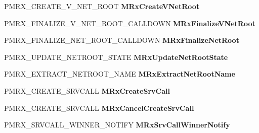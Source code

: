 \begin{DoxyCompactItemize}
P\+M\+R\+X\+\_\+\+C\+R\+E\+A\+T\+E\+\_\+\+V\+\_\+\+N\+E\+T\+\_\+\+R\+O\+OT {\bfseries M\+Rx\+Create\+V\+Net\+Root}
\item 
\mbox{\label{struct___m_i_n_i_r_d_r___d_i_s_p_a_t_c_h_aa630f1c91134513de3829a5057c970ea}} 
P\+M\+R\+X\+\_\+\+F\+I\+N\+A\+L\+I\+Z\+E\+\_\+\+V\+\_\+\+N\+E\+T\+\_\+\+R\+O\+O\+T\+\_\+\+C\+A\+L\+L\+D\+O\+WN {\bfseries M\+Rx\+Finalize\+V\+Net\+Root}
\item 
\mbox{\label{struct___m_i_n_i_r_d_r___d_i_s_p_a_t_c_h_abea4e4f47180d23363abfcca13f8681e}} 
P\+M\+R\+X\+\_\+\+F\+I\+N\+A\+L\+I\+Z\+E\+\_\+\+N\+E\+T\+\_\+\+R\+O\+O\+T\+\_\+\+C\+A\+L\+L\+D\+O\+WN {\bfseries M\+Rx\+Finalize\+Net\+Root}
\item 
\mbox{\label{struct___m_i_n_i_r_d_r___d_i_s_p_a_t_c_h_ac30c7d28e8dcac00826da386a3f08d86}} 
P\+M\+R\+X\+\_\+\+U\+P\+D\+A\+T\+E\+\_\+\+N\+E\+T\+R\+O\+O\+T\+\_\+\+S\+T\+A\+TE {\bfseries M\+Rx\+Update\+Net\+Root\+State}
\item 
\mbox{\label{struct___m_i_n_i_r_d_r___d_i_s_p_a_t_c_h_a3e0fa1200ed0faec18392cd9650b435b}} 
P\+M\+R\+X\+\_\+\+E\+X\+T\+R\+A\+C\+T\+\_\+\+N\+E\+T\+R\+O\+O\+T\+\_\+\+N\+A\+ME {\bfseries M\+Rx\+Extract\+Net\+Root\+Name}
\item 
\mbox{\label{struct___m_i_n_i_r_d_r___d_i_s_p_a_t_c_h_aba0d9277b06ed5f042037ac4dbb34f10}} 
P\+M\+R\+X\+\_\+\+C\+R\+E\+A\+T\+E\+\_\+\+S\+R\+V\+C\+A\+LL {\bfseries M\+Rx\+Create\+Srv\+Call}
\item 
\mbox{\label{struct___m_i_n_i_r_d_r___d_i_s_p_a_t_c_h_a4bfc53909cd27f93500654cd6f0a6185}} 
P\+M\+R\+X\+\_\+\+C\+R\+E\+A\+T\+E\+\_\+\+S\+R\+V\+C\+A\+LL {\bfseries M\+Rx\+Cancel\+Create\+Srv\+Call}
\item 
\mbox{\label{struct___m_i_n_i_r_d_r___d_i_s_p_a_t_c_h_a56740317b05b52870c55065451d9f805}} 
P\+M\+R\+X\+\_\+\+S\+R\+V\+C\+A\+L\+L\+\_\+\+W\+I\+N\+N\+E\+R\+\_\+\+N\+O\+T\+I\+FY {\bfseries M\+Rx\+Srv\+Call\+Winner\+Notify}
\item 

\end{DoxyCompactItemize}

